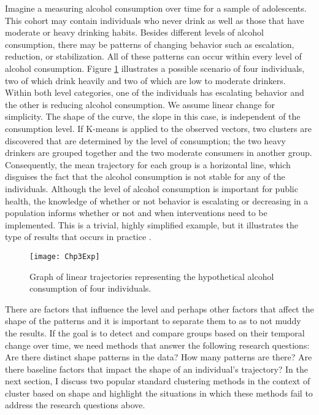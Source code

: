 Imagine a measuring alcohol consumption over time for a sample of adolescents. This cohort may contain individuals who never drink as well as those that have moderate or heavy drinking habits. Besides different levels of alcohol consumption, there may be patterns of changing behavior such as escalation, reduction, or stabilization. All of these patterns can occur within every level of alcohol consumption. Figure \ref{fig:3-1} illustrates a possible scenario of four individuals, two of which drink heavily and two of which are low to moderate drinkers. Within both level categories, one of the individuals has escalating behavior and the other is reducing alcohol consumption. We assume linear change for simplicity. The shape of the curve, the slope in this case, is independent of the consumption level. If K-means is applied to the observed vectors, two clusters are discovered that are determined by the level of consumption; the two heavy drinkers are grouped together and the two moderate consumers in another group. Consequently, the mean trajectory for each group is a horizontal line, which disguises the fact that the alcohol consumption is not stable for any of the individuals. Although the level of alcohol consumption is important for public health, the knowledge of whether or not behavior is escalating or decreasing in a population informs whether or not and when interventions need to be implemented. This is a trivial, highly simplified example, but it illustrates the type of results that occurs in practice \cite{mccoy2010}.

\begin{figure}
\begin{center}
\texttt{[image: Chp3Exp]}
\end{center}
\caption{Graph of linear trajectories representing the hypothetical alcohol consumption of four individuals.}
\label{fig:3-1}
\end{figure}

There are factors that influence the level and perhaps other factors that affect the shape of the patterns and it is important to separate them to as to not muddy the results. If the goal is to detect and compare groups based on their temporal change over time, we need methods that answer the following research questions: Are there distinct shape patterns in the data? How many patterns are there? Are there baseline factors that impact the shape of an individual's trajectory? In the next section, I discuss two popular standard clustering methods in the context of cluster based on shape and highlight the situations in which these methods fail to address the research questions above. 

